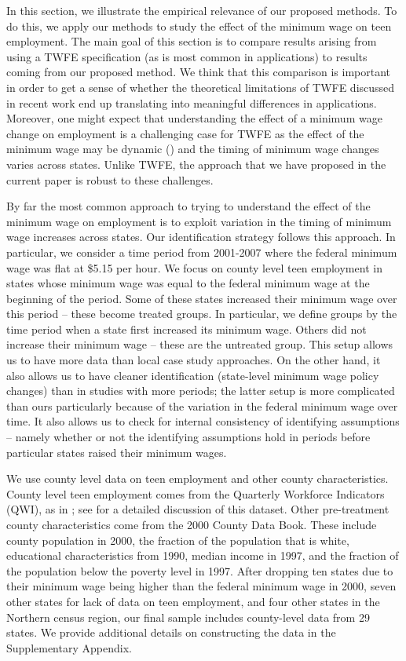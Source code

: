 \documentclass[11pt]{article}%
\theoremstyle{plain}
\numberwithin{sassumption}{section}
\numberwithin{equation}{section}
\begin{document}
In this section, we illustrate the empirical relevance of our proposed
methods. To do this, we apply our methods to study the effect of the minimum
wage on teen employment. The main goal of this section is to compare results
arising from using a TWFE specification (as is most common in applications) to
results coming from our proposed method. We think that this comparison is
important in order to get a sense of whether the theoretical limitations of
TWFE discussed in recent work end up translating into meaningful differences
in applications. Moreover, one might expect that understanding the effect of a
minimum wage change on employment is a challenging case for TWFE as the effect
of the minimum wage may be dynamic (\cite{Meer2016}) and the timing of minimum
wage changes varies across states. Unlike TWFE, the approach that we have
proposed in the current paper is robust to these challenges.

By far the most common approach to trying to understand the effect of the
minimum wage on employment is to exploit variation in the timing of minimum
wage increases across states. Our identification strategy follows this
approach. In particular, we consider a time period from 2001-2007 where the
federal minimum wage was flat at \$5.15 per hour. We focus on county level
teen employment in states whose minimum wage was equal to the federal minimum
wage at the beginning of the period. Some of these states increased their
minimum wage over this period -- these become treated groups.  In particular, we define groups by the time period when a state first increased its minimum wage.  Others did not increase their minimum wage -- these are the untreated group. This setup allows us to have more data than
local case study approaches. On the other hand, it also allows us to have
cleaner identification (state-level minimum wage policy changes) than in
studies with more periods; the latter setup is more complicated than ours
particularly because of the variation in the federal minimum wage over time.
It also allows us to check for internal consistency of identifying assumptions
-- namely whether or not the identifying assumptions hold in periods before
particular states raised their minimum wages.


We use county level data on teen employment and other county characteristics.
County level teen employment comes from the Quarterly Workforce Indicators
(QWI), as in \cite{Dube2016}; see \cite{Dube2016} for a detailed discussion of
this dataset. Other pre-treatment county characteristics come from the 2000
County Data Book. These include county population in 2000, the fraction of the
population that is white,
educational characteristics from 1990, median income in 1997, and the fraction
of the population below the poverty level in 1997.  After dropping ten states due to their minimum wage being higher than the federal minimum wage in 2000, seven other states for lack of data on teen employment, and four other states in the Northern census region, our final sample includes county-level data from 29 states.  We provide additional details on constructing the data in the Supplementary Appendix.  
\end{document}
